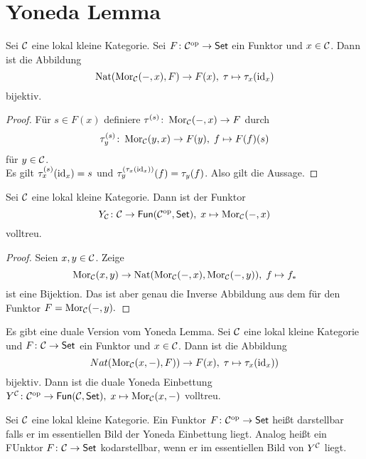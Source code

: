 \section{Yoneda Lemma}
\begin{Satz}\label{Lem:Yoneda}
    Sei \(\mathcal{C}\) eine lokal kleine Kategorie. Sei \(F\colon \mathcal{C}^{\mathrm{op}}\to\mathsf{Set}\) ein Funktor und \(x\in\mathcal{C}\). Dann ist die Abbildung 
    \[\operatorname{Nat}(\operatorname{Mor}_{\mathcal{C}}(-,x),F)\to F(x),\; \tau\mapsto \tau_x(\mathrm{id}_x)\] bijektiv.
\end{Satz}
\begin{proof}
    Für \(s\in F(x)\) definiere \(\tau^{(s)}\colon\operatorname{Mor}_{\mathcal{C}}(-,x)\to F\) durch \[\tau_y^{(s)}\colon \operatorname{Mor}_{\mathcal{C}}(y,x)\to F(y),\; f\mapsto F(f)(s)\] für \(y\in \mathcal{C}\).\\
    Es gilt \(\tau_x^{(s)}(\mathrm{id}_x)=s\) und \(\tau_y^{(\tau_x(\mathrm{id}_x))}(f)=\tau_y(f)\).
    Also gilt die Aussage.
\end{proof}
\begin{Kor}
    Sei \(\mathcal{C}\) eine lokal kleine Kategorie. Dann ist der Funktor \[Y_{\mathcal{C}}\colon\mathcal{C}\to\mathsf{Fun}(\mathcal{C}^{\mathrm{op}},\mathsf{Set}),\; x\mapsto \operatorname{Mor}_{\mathcal{C}}(-,x)\] volltreu.
\end{Kor}
\begin{proof}
    Seien \(x,y\in\mathcal{C}\). Zeige 
    \[\operatorname{Mor}_{\mathcal{C}}(x,y)\to\operatorname{Nat}(\operatorname{Mor}_{\mathcal{C}}(-,x),\operatorname{Mor}_{\mathcal{C}}(-,y)),\; f\mapsto f_*\] ist eine Bijektion. Das ist aber genau die Inverse Abbildung aus dem  für den Funktor \(F=\operatorname{Mor}_{\mathcal{C}}(-,y).\)
\end{proof}
\begin{Bem}
    Es gibt eine duale Version vom Yoneda Lemma. Sei \(\mathcal{C}\) eine lokal kleine Kategorie und \(F\colon\mathcal{C}\to\mathsf{Set}\) ein Funktor und \(x\in\mathcal{C}\). Dann ist die Abbildung 
    \[Nat(\operatorname{Mor}_{\mathcal{C}}(x,-),F))\to F(x),\; \tau\mapsto \tau_x(\mathrm{id}_x))\] bijektiv. Dann ist die duale Yoneda Einbettung \(Y^{\mathcal{C}}\colon\mathcal{C}^{\mathrm{op}}\to\mathsf{Fun}(\mathcal{C},\mathsf{Set}),\; x\mapsto \operatorname{Mor}_{\mathcal{C}}(x,-)\) volltreu.
\end{Bem}
\begin{Def}
    Sei \(\mathcal{C}\) eine lokal kleine Kategorie. Ein Funktor \(F\colon\mathcal{C}^{\mathrm{op}}\to \mathsf{Set}\) heißt darstellbar falls er im essentiellen Bild der Yoneda Einbettung liegt.  Analog heißt ein FUnktor \(F\colon\mathcal{C}\to\mathsf{Set}\)  kodarstellbar, wenn er im essentiellen Bild von \(Y^{\mathcal{C}}\) liegt.
\end{Def}
